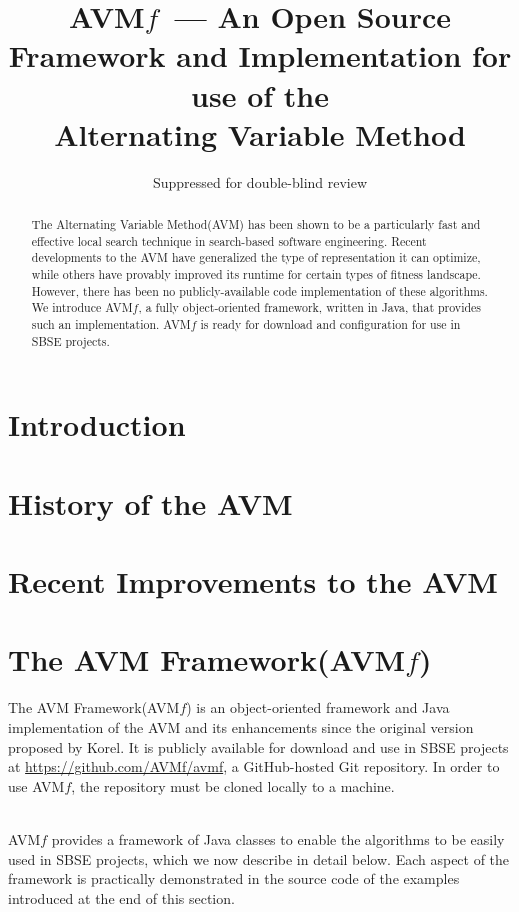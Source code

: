 \documentclass{llncs}
\newcommand{\AVM}{Alternating Variable Method\xspace}
\newcommand{\longname}{AVM Framework\xspace}
\newcommand{\name}{AVM\hspace{-1pt}$f$\xspace}
\newcommand{\repourl}{\url{https://github.com/AVMf/avmf}\xspace}
\begin{document}
\title{\name ~--- An Open Source Framework and Implementation for use of the \\ \AVM}
\author{Suppressed for double-blind review}

\maketitle

\begin{abstract}
The \AVM (AVM) has been shown to be a particularly fast and effective local search technique in search-based software engineering.%
%
Recent developments to the AVM have generalized the type of representation it can optimize, while others have provably improved its runtime for certain types of fitness landscape. However, there has been no publicly-available code implementation of these algorithms. We introduce \name, a  fully object-oriented framework, written in Java, that provides such an implementation. \name is ready for download and configuration for use in SBSE projects.

\end{abstract}

\section{Introduction}

\section{History of the AVM}

\section{Recent Improvements to the AVM}

\section{The \longname (\name)}
The \longname (\name) is an object-oriented framework and Java implementation of the AVM and its enhancements since the original version proposed by Korel. It is publicly available for download and use in SBSE projects at \repourl, a GitHub-hosted Git repository. In order to use \name, the repository must be cloned locally to a machine.

~\\
\name provides a framework of Java classes to enable the algorithms to be easily used in SBSE projects, which we now describe in detail below. Each aspect of the framework is practically demonstrated in the source code of the examples introduced at the end of this section.
\end{document}
